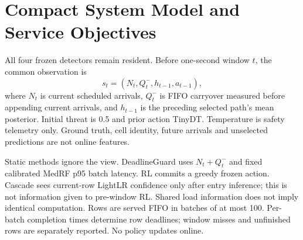 \section{Compact System Model and Service Objectives}\label{sec:system}
All four frozen detectors remain resident. Before one-second window $t$, the common observation is
\begin{equation}\label{eq:state}s_t=(N_t,Q_t^-,h_{t-1},a_{t-1}),\end{equation}
where $N_t$ is current scheduled arrivals, $Q_t^-$ is FIFO carryover measured before appending current arrivals, and $h_{t-1}$ is the preceding selected path's mean posterior. Initial threat is 0.5 and prior action TinyDT. Temperature is safety telemetry only. Ground truth, cell identity, future arrivals and unselected predictions are not online features.

Static methods ignore the view. DeadlineGuard uses $N_t+Q_t^-$ and fixed calibrated MedRF p95 batch latency. RL commits a greedy frozen action. Cascade sees current-row LightLR confidence only after entry inference; this is not information given to pre-window RL. Shared load information does not imply identical computation. Rows are served FIFO in batches of at most 100. Per-batch completion times determine row deadlines; window misses and unfinished rows are separately reported. No policy updates online.
